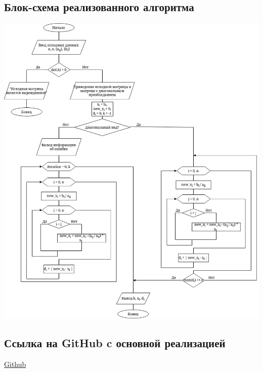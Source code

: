 \documentclass{article}
\begin{document}
\subsection{Блок-схема реализованного алгоритма}
      \includegraphics[scale=0.5]{AlgoSheme.png}
\subsection{Ссылка на GitHub c основной реализацией}
      \href{https://github.com/isofinly/compmath}{Github}
\end{document}
